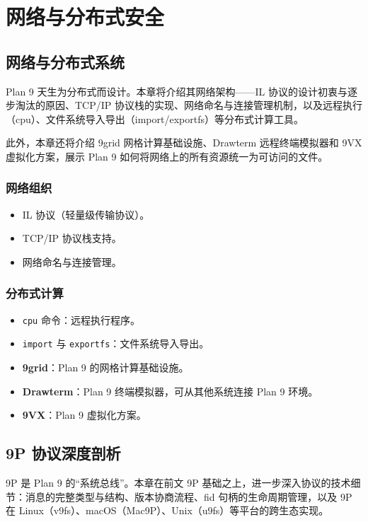 \documentclass[12pt,UTF8]{ctexbook}
\begin{document}
\part{网络与分布式安全}

\chapter{网络与分布式系统}

Plan 9 天生为分布式而设计。本章将介绍其网络架构——IL 协议的设计初衷与逐步淘汰的原因、TCP/IP 协议栈的实现、网络命名与连接管理机制，以及远程执行（cpu）、文件系统导入导出（import/exportfs）等分布式计算工具。

此外，本章还将介绍 9grid 网格计算基础设施、Drawterm 远程终端模拟器和 9VX 虚拟化方案，展示 Plan 9 如何将网络上的所有资源统一为可访问的文件。

\section{网络组织}

\begin{itemize}
\item IL 协议（轻量级传输协议）。
\item TCP/IP 协议栈支持。
\item 网络命名与连接管理。
\end{itemize}

\section{分布式计算}

\begin{itemize}
\item \texttt{cpu} 命令：远程执行程序。
\item \texttt{import} 与 \texttt{exportfs}：文件系统导入导出。
\item \textbf{9grid}：Plan 9 的网格计算基础设施。
\item \textbf{Drawterm}：Plan 9 终端模拟器，可从其他系统连接 Plan 9 环境。
\item \textbf{9VX}：Plan 9 虚拟化方案。
\end{itemize}

\chapter{9P 协议深度剖析}

9P 是 Plan 9 的“系统总线”。本章在前文 9P 基础之上，进一步深入协议的技术细节：消息的完整类型与结构、版本协商流程、fid 句柄的生命周期管理，以及 9P 在 Linux（v9fs）、macOS（Mac9P）、Unix（u9fs）等平台的跨生态实现。
\end{document}
